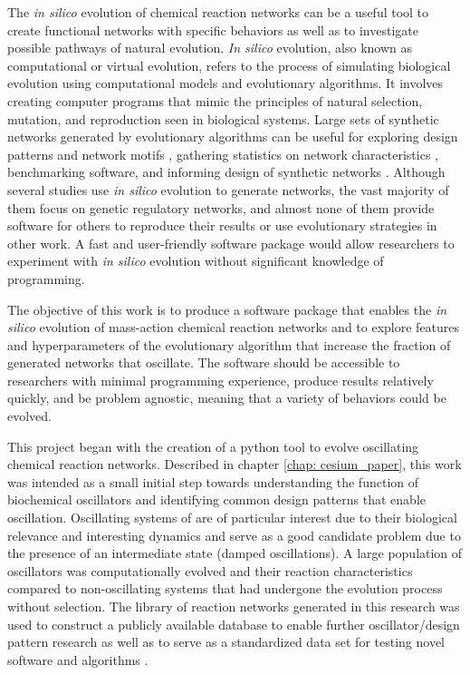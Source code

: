 \documentclass[12pt]{report}
\begin{document}
The \textit{in silico} evolution of chemical reaction networks can be a useful tool to create functional networks with specific behaviors as well as to investigate possible pathways of natural evolution. \textit{In silico} evolution, also known as computational or virtual evolution, refers to the process of simulating biological evolution using computational models and evolutionary algorithms. It involves creating computer programs that mimic the principles of natural selection, mutation, and reproduction seen in biological systems. Large sets of synthetic networks generated by evolutionary algorithms can be useful for exploring design patterns and network motifs \cite{Novak2008, Alon2007, jin_evolving_2008}, gathering statistics on network characteristics \cite{Tatka2023, deckard2009}, benchmarking software, and informing design of synthetic networks \cite{smith_designing_2017}. Although several studies use \textit{in silico} evolution to generate networks, the vast majority of them focus on genetic regulatory networks, and almost none of them provide software for others to reproduce their results or use evolutionary strategies in other work. A fast and user-friendly software package would allow researchers to experiment with \textit{in silico} evolution without significant knowledge of programming. 



The objective of this work is to produce a software package that enables the \textit{in silico} evolution of mass-action chemical reaction networks and to explore features and hyperparameters of the evolutionary algorithm that increase the fraction of generated networks that oscillate. The software should be accessible to researchers with minimal programming experience, produce results relatively quickly, and be problem agnostic, meaning that a variety of behaviors could be evolved.  

This project began with the creation of a python tool to evolve oscillating chemical reaction networks. Described in chapter \ref{chap: cesium_paper}, this work was intended as a small initial step towards understanding the function of biochemical oscillators and identifying common design patterns that enable oscillation. Oscillating systems of are of particular interest due to their biological relevance and interesting dynamics and serve as a good candidate problem due to the presence of an intermediate state (damped oscillations). A large population of oscillators was computationally evolved and their reaction characteristics compared to non-oscillating systems that had undergone the evolution process without selection. The library of reaction networks generated in this research was used to construct a publicly available database to enable further oscillator/design pattern research as well as to serve as a standardized data set for testing novel software and algorithms \cite{Tatka2023}. 
\end{document}
